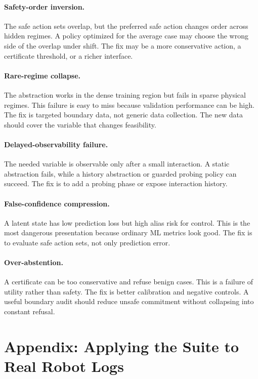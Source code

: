 \documentclass{article}
\begin{document}
\paragraph{Safety-order inversion.}
The safe action sets overlap, but the preferred safe action changes order across
hidden regimes. A policy optimized for the average case may choose the wrong side
of the overlap under shift. The fix may be a more conservative action, a
certificate threshold, or a richer interface.

\paragraph{Rare-regime collapse.}
The abstraction works in the dense training region but fails in sparse physical
regimes. This failure is easy to miss because validation performance can be high.
The fix is targeted boundary data, not generic data collection. The new data
should cover the variable that changes feasibility.

\paragraph{Delayed-observability failure.}
The needed variable is observable only after a small interaction. A static
abstraction fails, while a history abstraction or guarded probing policy can
succeed. The fix is to add a probing phase or expose interaction history.

\paragraph{False-confidence compression.}
A latent state has low prediction loss but high alias risk for control. This is
the most dangerous presentation because ordinary ML metrics look good. The fix is
to evaluate safe action sets, not only prediction error.

\paragraph{Over-abstention.}
A certificate can be too conservative and refuse benign cases. This is a failure
of utility rather than safety. The fix is better calibration and negative
controls. A useful boundary audit should reduce unsafe commitment without
collapsing into constant refusal.

\section{Appendix: Applying the Suite to Real Robot Logs}
\end{document}
